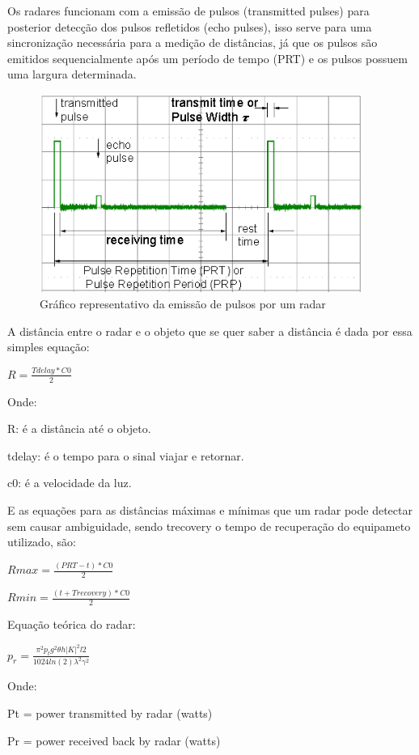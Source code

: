 Os radares funcionam com a emissão de pulsos (transmitted pulses) para posterior detecção dos pulsos refletidos
(echo pulses), isso serve para uma sincronização necessária para a medição de distâncias, já que os pulsos
são emitidos sequencialmente após um período de tempo (PRT) e os pulsos possuem
uma largura determinada.

\begin{figure}[h]
  \centering
  \includegraphics[width=400px, scale=1]{figuras/emissao_pulsos_radar}
  \caption{Gráfico representativo da emissão de pulsos por um radar}
\label{fig:emissao_pulsos_radar}
\end{figure}

A distância entre o radar e o objeto que se quer saber a distância é dada por essa simples equação:

$ R = \displaystyle\frac{Tdelay * C0}{2}$

Onde:

	R: é a distância até o objeto.

	tdelay: é o tempo para o sinal viajar e retornar.

	c0: é a velocidade da luz.

  E as equações para as distâncias máximas e mínimas que um radar pode detectar sem
  causar ambiguidade, sendo trecovery o tempo de recuperação do equipameto
   utilizado, são:


$ Rmax = \frac{(PRT - t) * C0}{2}$

$ Rmin = \frac{(t + Trecovery) * C0}{2}$




Equação teórica do radar:

$p_{r} = \frac{\pi ^{2}p_{t}g^{2}\theta h |K|^{2}l2}{1024ln(2)\lambda ^{2}\gamma ^{2}}$

Onde:

Pt = power transmitted by radar (watts)

Pr = power received back by radar (watts)

